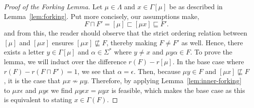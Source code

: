 \documentclass[11pt]{article}
\newcommand{\univ}{\Sigma}
\newcommand{\glang}{\Lambda}
\begin{document}

\begin{proof}[Proof of the Forking Lemma]
    Let $\mu \in \glang$ and $x \in \Gamma[\mu]$ be as described in Lemma~\ref{lem:forking}.
    Put more concisely, our assumptions make,
    $$F\sqcap F' = [\mu] \sqsubset [\mu x] \sqsubseteq F'.$$
    and from this, the reader should observe that the strict ordering relation between $[\mu]$ and $[\mu x]$ ensures $[\mu x] \not\sqsubseteq F$, thereby making $F \neq F'$ as well.
    Hence, there exists a letter $y \in \Gamma[\mu]$ and $\alpha \in \univ^*$ where $y \neq x$ and $\mu y \alpha \in F$.
    To prove the lemma, we will induct over the difference $r(F) - r[\mu]$.
    In the base case where $r(F) - r(F\sqcap F') = 1$, we see that $\alpha = \epsilon$.
    Then, because $\mu y \in F$ and $[\mu x] \not \sqsubseteq F$, it is the case that $\mu x \not\sim \mu y$.
    Therefore, by applying Lemma~\ref{lem:inner-forking} to $\mu x \epsilon$ and $\mu y \epsilon$ we find $\mu y \epsilon x = \mu y x$ is feasible, which makes the base case as this is equivalent to stating $x \in \Gamma(F)$.


\end{proof}
\end{document}
